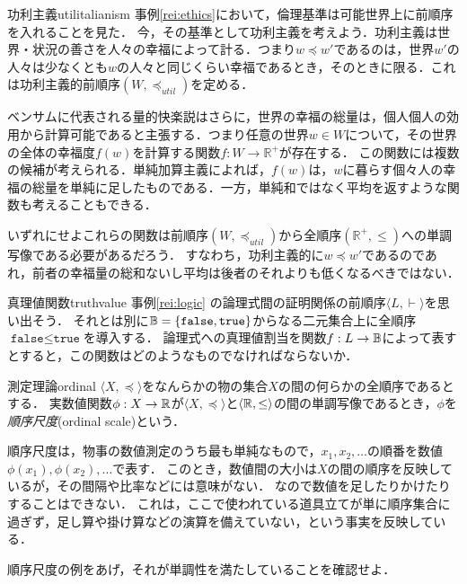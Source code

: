 \documentclass[dvipdfmx,11pt,a4paper]{jsarticle}
\begin{document}
\begin{rei}{功利主義}{utilitalianism}
  事例\ref{rei:ethics}において，倫理基準は可能世界上に前順序を入れることを見た．
  今，その基準として功利主義を考えよう．功利主義は世界・状況の善さを人々の幸福によって計る．つまり$w \preceq w'$であるのは，世界$w'$の人々は少なくとも$w$の人々と同じくらい幸福であるとき，そのときに限る．これは功利主義的前順序$(W, \preceq_{util})$を定める．
 
  ベンサムに代表される量的快楽説はさらに，世界の幸福の総量は，個人個人の効用から計算可能であると主張する．つまり任意の世界$w \in W$について，その世界の全体の幸福度$f(w)$を計算する関数$f: W \to \mathbb{R^+}$が存在する．
  この関数には複数の候補が考えられる．単純加算主義によれば，$f(w)$は，$w$に暮らす個々人の幸福の総量を単純に足したものである．一方，単純和ではなく平均を返すような関数も考えることもできる．
  
  いずれにせよこれらの関数は前順序$(W, \preceq_{util})$から全順序$(\mathbb{R^+}, \leq )$への単調写像である必要があるだろう．
  すなわち，功利主義的に$w \preceq w'$であるのであれ，前者の幸福量の総和ないし平均は後者のそれよりも低くなるべきではない．
\end{rei}


\begin{rei}{真理値関数}{truthvalue}
事例\ref{rei:logic} の論理式間の証明関係の前順序$\langle L, \vdash \rangle$を思い出そう．
それとは別に$\mathbb{B} = \{ \texttt{false}, \texttt{true} \}$からなる二元集合上に全順序$\texttt{false} \leq \texttt{true}$を導入する．
論理式への真理値割当を関数$f:L \to \mathbb{B}$によって表すとすると，この関数はどのようなものでなければならないか．
\end{rei}

\begin{rei}{測定理論}{ordinal}
$\langle X, \preceq \rangle$をなんらかの物の集合$X$の間の何らかの全順序であるとする．
実数値関数$\phi:X \to \mathbb{R}$が$\langle X, \preceq \rangle$と$\langle \mathbb{R}, \leq \rangle$の間の単調写像であるとき，$\phi$を\emph{順序尺度}(ordinal scale)という．

順序尺度は，物事の数値測定のうち最も単純なもので，$x_1, x_2, \dots$の順番を数値$\phi(x_1), \phi(x_2), \dots$で表す．
このとき，数値間の大小は$X$の間の順序を反映しているが，その間隔や比率などには意味がない．
なので数値を足したりかけたりすることはできない．
これは，ここで使われている道具立てが単に順序集合に過ぎず，足し算や掛け算などの演算を備えていない，という事実を反映している．
\end{rei}

\begin{renshu}{}{}
 順序尺度の例をあげ，それが単調性を満たしていることを確認せよ．
\end{renshu}
\end{document}
